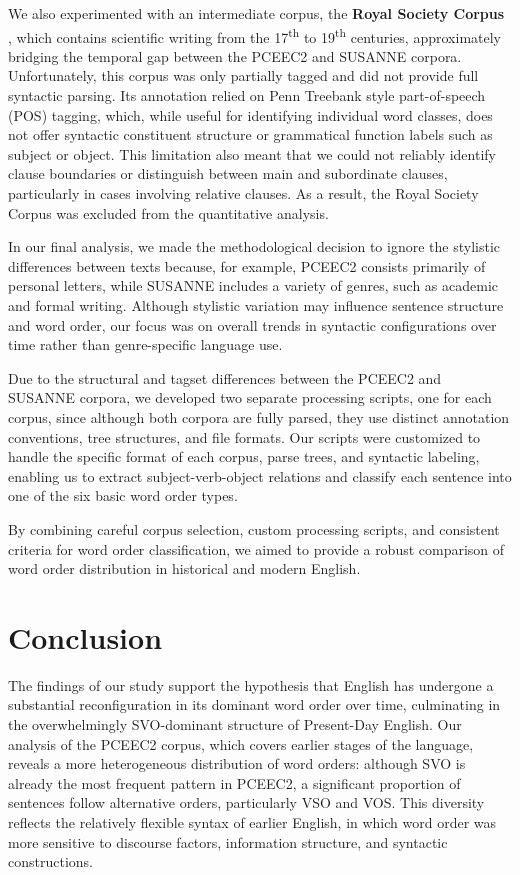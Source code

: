 \documentclass{article}
\begin{document}
We also experimented with an intermediate corpus, the \textbf{Royal Society Corpus} \cite{RSCorpus}, which contains scientific writing from the 17\textsuperscript{th} to 19\textsuperscript{th} centuries, approximately bridging the temporal gap between the PCEEC2 and SUSANNE corpora. Unfortunately, this corpus was only partially tagged and did not provide full syntactic parsing. Its annotation relied on Penn Treebank style part-of-speech (POS) tagging, which, while useful for identifying individual word classes, does not offer syntactic constituent structure or grammatical function labels such as subject or object. This limitation also meant that we could not reliably identify clause boundaries or distinguish between main and subordinate clauses, particularly in cases involving relative clauses. As a result, the Royal Society Corpus was excluded from the quantitative analysis.

In our final analysis, we made the methodological decision to ignore the stylistic differences between texts because, for example, PCEEC2 consists primarily of personal letters, while SUSANNE includes a variety of genres, such as academic and formal writing. Although stylistic variation may influence sentence structure and word order, our focus was on overall trends in syntactic configurations over time rather than genre-specific language use.

Due to the structural and tagset differences between the PCEEC2 and SUSANNE corpora, we developed two separate processing scripts, one for each corpus, since although both corpora are fully parsed, they use distinct annotation conventions, tree structures, and file formats. Our scripts were customized to handle the specific format of each corpus, parse trees, and syntactic labeling, enabling us to extract subject-verb-object relations and classify each sentence into one of the six basic word order types.

By combining careful corpus selection, custom processing scripts, and consistent criteria for word order classification, we aimed to provide a robust comparison of word order distribution in historical and modern English.

\section{Conclusion}

The findings of our study support the hypothesis that English has undergone a substantial reconfiguration in its dominant word order over time, culminating in the overwhelmingly SVO-dominant structure of Present-Day English. Our analysis of the PCEEC2 corpus, which covers earlier stages of the language, reveals a more heterogeneous distribution of word orders: although SVO is already the most frequent pattern in PCEEC2, a significant proportion of sentences follow alternative orders, particularly VSO and VOS. This diversity reflects the relatively flexible syntax of earlier English, in which word order was more sensitive to discourse factors, information structure, and syntactic constructions.
\end{document}
